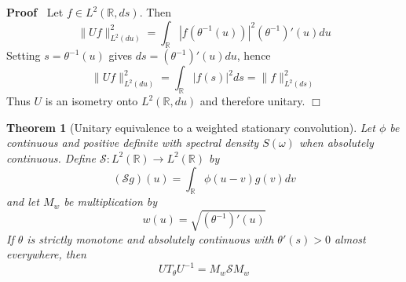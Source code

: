 \documentclass{article}
\newenvironment{proof}{\noindent\textbf{Proof\ }}{\hspace*{\fill}$\Box$\medskip}
{\theorembodyfont{\rmfamily}\newtheorem{example}{Example}}
\newtheorem{theorem}{Theorem}
\begin{document}
\begin{proof}
  Let $f \in L^2 (\mathbb{R}, ds)$. Then
  \begin{equation}
    \|Uf\|_{L^2  (du)}^2 = \int_{\mathbb{R}} |f (\theta^{- 1} (u)) |^2
    (\theta^{- 1})' (u) du
  \end{equation}
  Setting $s = \theta^{- 1} (u)$ gives $ds = (\theta^{- 1})' (u) du$, hence
  \begin{equation}
    \|Uf\|_{L^2  (du)}^2 = \int_{\mathbb{R}} |f (s) |^2 ds = \|f\|_{L^2 
    (ds)}^2
  \end{equation}
  Thus $U$ is an isometry onto $L^2 (\mathbb{R}, du)$ and therefore unitary.
\end{proof}

\begin{theorem}[Unitary equivalence to a weighted stationary convolution]
  Let $\phi$ be continuous and positive definite with spectral density $S
  (\omega)$ when absolutely continuous. Define $\mathcal{S}: L^2 (\mathbb{R})
  \to L^2 (\mathbb{R})$ by
  \begin{equation}
    (\mathcal{S}g) (u) = \int_{\mathbb{R}} \phi (u - v) g (v) dv
  \end{equation}
  and let $M_w$ be multiplication by
  \begin{equation}
    w (u) = \sqrt{(\theta^{- 1})' (u)}
  \end{equation}
  If $\theta$ is strictly monotone and absolutely continuous with $\theta' (s)
  > 0$ almost everywhere, then
  \begin{equation}
    UT_{\theta} U^{- 1} = M_w \mathcal{S}M_w
  \end{equation}
\end{theorem}
\end{document}
